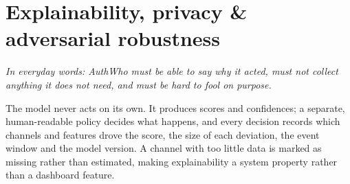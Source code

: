 \documentclass[10pt,letterpaper]{article}
\begin{document}
\section{Explainability, privacy \& adversarial robustness}

\emph{In everyday words: AuthWho must be able to say why it acted, must not collect anything it does not need, and must be hard to fool on purpose.}

The model never acts on its own. It produces scores and confidences; a separate, human-readable policy decides what happens, and every decision records which channels and features drove the score, the size of each deviation, the event window and the model version. A channel with too little data is marked as missing rather than estimated, making explainability a system property rather than a dashboard feature.
\end{document}
